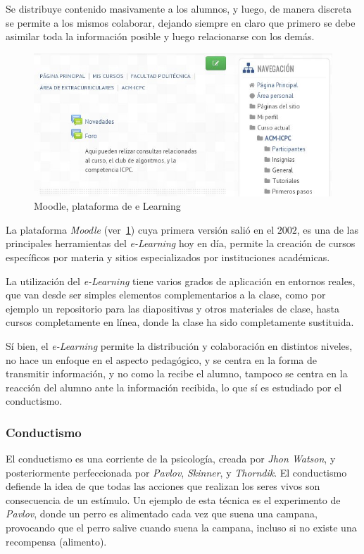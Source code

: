 Se distribuye contenido masivamente a los alumnos, y luego, de manera discreta
se permite a los mismos colaborar, dejando siempre en claro que primero se debe
asimilar toda la información posible y luego relacionarse con los
demás\cite{leinonen:ict}.


\begin{figure}[h] 
\centering 
\includegraphics[scale=0.5]{tics/images/moodle.jpg}
\caption{Moodle, plataforma de e Learning} 
\label{fig:moodle}
\end{figure}


La plataforma \emph{Moodle} (ver~\ref{fig:moodle}) cuya primera versión salió en
el $2002$, es una de las principales herramientas del \emph{e-Learning} hoy en
día, permite la creación de cursos específicos por materia y sitios
especializados por instituciones académicas\cite{perkins2006using}. 

La utilización del \emph{e-Learning} tiene varios grados de aplicación en
entornos reales\cite{punie:ict}, que van desde ser simples elementos
complementarios a la clase, como por ejemplo un repositorio para las
diapositivas y otros materiales de clase, hasta cursos completamente en línea,
donde la clase ha sido completamente sustituida.

Sí bien, el \emph{e-Learning} permite la distribución y colaboración en
distintos niveles, no hace un enfoque en el aspecto pedagógico, y se centra en
la forma de transmitir información, y no como la recibe el
alumno\cite{leinonen:ict}, tampoco se centra en la reacción del alumno ante la
información recibida, lo que sí es estudiado por el
conductismo\cite{weegar2012comparison}.

\subsubsection{Conductismo}

El conductismo es una corriente de la psicología, creada por \textit{Jhon
    Watson}, y posteriormente perfeccionada por \textit{Pavlov},
\textit{Skinner}, y \textit{Thorndik}. El conductismo defiende la idea de que
todas las acciones que realizan los seres vivos son consecuencia de un
estímulo. Un ejemplo de esta técnica es el experimento de \textit{Pavlov},
donde un perro es alimentado cada vez que suena una campana, provocando que el
perro salive cuando suena la campana, incluso si no existe una recompensa
(alimento)\cite{weegar2012comparison}.

